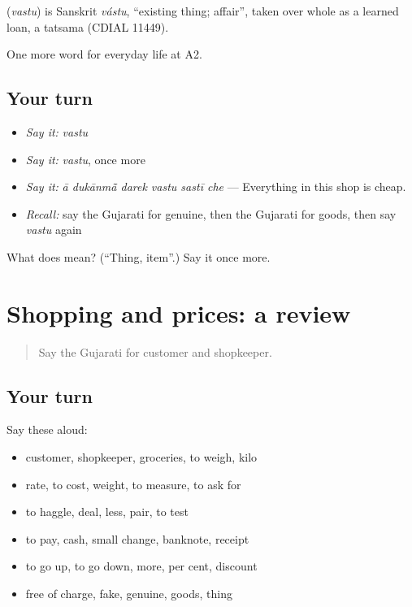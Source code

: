 \begin{cousinweb}
\textbf{} (\emph{vastu}) is Sanskrit \emph{vástu}, \textquotedblleft{}existing thing; affair\textquotedblright{}, taken over whole as a learned loan, a tatsama (CDIAL 11449).
\end{cousinweb}

\begin{grammarlens}[title={What you've built}]
One more word for everyday life at A2.
\end{grammarlens}

\subsection*{Your turn}
\begin{itemize}
\raggedright
  \item \emph{Say it:} \emph{vastu}
  \item \emph{Say it:} \emph{vastu}, once more
  \item \emph{Say it:} \emph{ā dukānmā̃ darek vastu sastī che} — Everything in this shop is cheap.
  \item \emph{Recall:} say the Gujarati for genuine, then the Gujarati for goods, then say \emph{vastu} again
\end{itemize}

\begin{tcolorbox}[breakable,colback=teal!4,colframe=teal!35!black,title={Before you move on}]
What does  mean? (\textquotedblleft{}Thing, item\textquotedblright{}.) Say it once more.
\end{tcolorbox}
\section[(dialogue)]{Shopping and prices: a review}

\label{lesson:GU-R188-review-183-188}



\begin{quote}
Say the Gujarati for customer and shopkeeper.
\end{quote}

\subsection*{Your turn}
Say these aloud:

\begin{itemize}
\raggedright
  \item customer, shopkeeper, groceries, to weigh, kilo
  \item rate, to cost, weight, to measure, to ask for
  \item to haggle, deal, less, pair, to test
  \item to pay, cash, small change, banknote, receipt
  \item to go up, to go down, more, per cent, discount
  \item free of charge, fake, genuine, goods, thing
\end{itemize}

